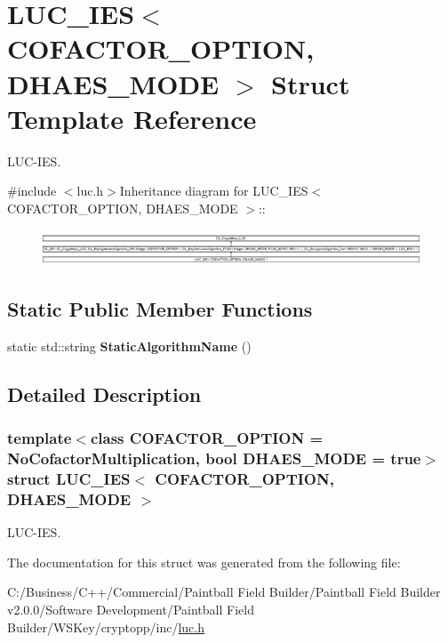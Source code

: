 \hypertarget{struct_l_u_c___i_e_s}{
\section{LUC\_\-IES$<$ COFACTOR\_\-OPTION, DHAES\_\-MODE $>$ Struct Template Reference}
\label{struct_l_u_c___i_e_s}
}


LUC-\/IES.  


{\ttfamily \#include $<$luc.h$>$}Inheritance diagram for LUC\_\-IES$<$ COFACTOR\_\-OPTION, DHAES\_\-MODE $>$::\begin{figure}[H]
\begin{center}
\leavevmode
\includegraphics[height=1.07417cm]{struct_l_u_c___i_e_s}
\end{center}
\end{figure}
\subsection*{Static Public Member Functions}
\begin{DoxyCompactItemize}
\item 
\hypertarget{struct_l_u_c___i_e_s_ad1c426159002bd253d6fd49723fa251c}{
static std::string {\bfseries StaticAlgorithmName} ()}
\label{struct_l_u_c___i_e_s_ad1c426159002bd253d6fd49723fa251c}

\end{DoxyCompactItemize}


\subsection{Detailed Description}
\subsubsection*{template$<$class COFACTOR\_\-OPTION = NoCofactorMultiplication, bool DHAES\_\-MODE = true$>$ struct LUC\_\-IES$<$ COFACTOR\_\-OPTION, DHAES\_\-MODE $>$}

LUC-\/IES. 

The documentation for this struct was generated from the following file:\begin{DoxyCompactItemize}
\item 
C:/Business/C++/Commercial/Paintball Field Builder/Paintball Field Builder v2.0.0/Software Development/Paintball Field Builder/WSKey/cryptopp/inc/\hyperlink{luc_8h}{luc.h}\end{DoxyCompactItemize}
